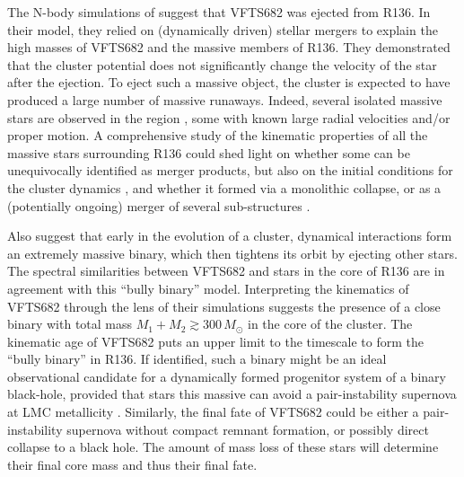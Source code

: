\documentclass[a4paper,fleqn,usenatbib]{mnras}
\begin{document}
The N-body simulations of \citet{banerjee:12} suggest that VFTS682 was ejected from R136. In their
model, they relied on (dynamically driven) stellar mergers to explain the high masses of
VFTS682 and the massive members of R136. They
demonstrated that the cluster potential does not significantly change
the velocity of the star after the ejection.
To eject such a massive object, the cluster is
expected to have produced a large number of massive runaways. Indeed, several %
isolated massive stars are observed in the region \citep[][]{evans:10,lennon:18}, some with known
large radial velocities and/or proper motion. 
A comprehensive study of the kinematic
properties of all the massive stars surrounding R136 could shed light
on whether some can be unequivocally identified as merger products,
but also on the initial conditions for the cluster dynamics
\citep[e.g.,][]{oh:16}, and whether it formed via a monolithic collapse, or
as a (potentially ongoing) merger of several sub-structures \citep[e.g.,][]{sabbi:12}.

Also \cite{fujii:11} suggest that
early in the evolution of a cluster, dynamical interactions form an extremely
massive binary, which then tightens its orbit by ejecting other
stars. The spectral similarities between VFTS682 and stars in the core
of R136 are in agreement with this ``bully binary'' model. Interpreting the kinematics of VFTS682 through the lens of their simulations
suggests the presence of a close binary with total mass
$M_1+M_2\gtrsim 300\,M_\odot$ in the core of the cluster. The kinematic age of VFTS682 puts an
upper limit to the timescale to form the ``bully binary'' in
R136. If identified, such a binary %
might be an ideal observational candidate for a dynamically formed progenitor system of
a binary black-hole, provided that stars this massive can avoid a
pair-instability supernova \cite[e.g.,][]{rakavy:67} at LMC
metallicity \citep[see also][]{langer:07, woosley:17}.
Similarly, the final fate of VFTS682 could be either a
pair-instability supernova without compact remnant formation, or
possibly direct collapse to a black hole. The amount of mass loss of these stars will determine their final core
mass and thus their final fate.
\end{document}
